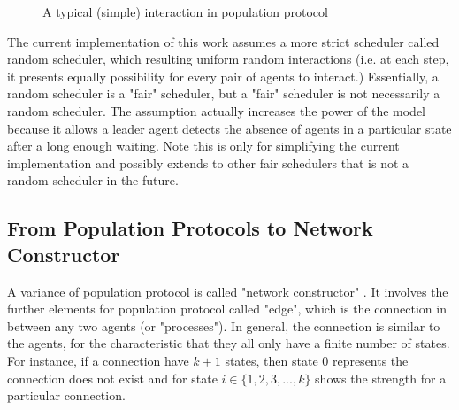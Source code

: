 \begin{figure}[H]
\begin{center}
\end{center}
\caption{A typical (simple) interaction in population protocol}
\end{figure}


\par
The current implementation of this work assumes a more strict scheduler called random scheduler,
which resulting uniform random interactions (i.e. at each step, it presents
equally possibility for every pair of agents to interact.) Essentially, a random scheduler is a "fair" scheduler, but a "fair" scheduler is not necessarily a random scheduler.
The assumption actually increases the power of the model because it allows a leader agent detects the absence
of agents in a particular state after a long enough waiting. Note this is only for
simplifying the current implementation and possibly extends to other fair schedulers that is not a
random scheduler in the future.

\subsection{From Population Protocols to Network Constructor \cite{MS16a}}
\par
A variance of population protocol is called "network constructor" \cite{MS16a}.
It involves the further elements for population protocol called "edge", which is
the connection in between any two agents (or "processes"). In general, the connection
is similar to the agents, for the characteristic that they all only have a finite number of states. For instance, if
a connection have $k + 1$ states, then state 0 represents the connection does not exist and for state $i \in \{1,2,3, ..., k\}$
shows the strength for a particular connection.


